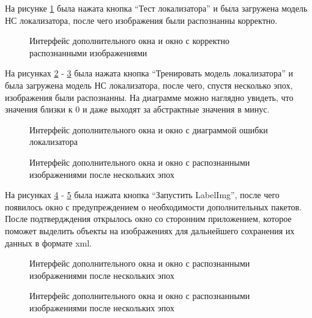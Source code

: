 На рисунке \ref{systemtest19:image} была нажата кнопка ``Тест локализатора'' и была загружена модель НС локализатора, после чего изображения были распознанны корректно.

\begin{figure}[H]
\caption{Интерфейс дополнительного окна и окно с корректно распознанными изображениями}
\label{systemtest19:image}
\end{figure}

На рисунках \ref{systemtest20:image} - \ref{systemtest21:image}  была нажата кнопка ``Тренировать модель локализатора'' и была загружена модель НС локализатора, после чего, спустя несколько эпох, изображения были распознанны. На диаграмме можно наглядно увидеть, что значения близки к 0 и даже выходят за абстрактные значения в минус.

\begin{figure}[H]
\caption{Интерфейс дополнительного окна и окно с диаграммой ошибки локализатора}
\label{systemtest20:image}
\end{figure}

\begin{figure}[H]
\caption{Интерфейс дополнительного окна и окно с распознанными изображениями после нескольких эпох}
\label{systemtest21:image}
\end{figure}

На рисунках \ref{systemtestlabelimg2:image} - \ref{systemtestlabelimg1:image}  была нажата кнопка ``Запустить LabelImg'', после чего появилось окно с предупреждением о необходимости дополнительных пакетов. После подтвердждения открылось окно со сторонним приложением, которое поможет выделить объекты на изображениях для дальнейшего сохранения их данных в формате xml.

\begin{figure}[H]
\caption{Интерфейс дополнительного окна и окно с распознанными изображениями после нескольких эпох}
\label{systemtestlabelimg2:image}
\end{figure}

\begin{figure}[H]
\caption{Интерфейс дополнительного окна и окно с распознанными изображениями после нескольких эпох}
\label{systemtestlabelimg1:image}
\end{figure}
